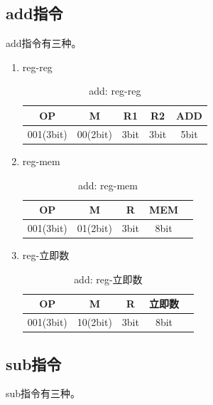 \documentclass[UTF8]{ctexrep}
\begin{document}
\subsection{add指令}
add指令有三种。

\begin{enumerate}
\item reg-reg
\begin{table}[H]
\centering
\begin{tabular}{|c|c|c|c|c|}
\hline
OP        & M        & R1   & R2   & ADD  \\ \hline
001(3bit) & 00(2bit) & 3bit & 3bit & 5bit \\ \hline
\end{tabular}
\caption{add: reg-reg}
\label{tab:7}
\end{table}

\item reg-mem
\begin{table}[H]
\centering
\begin{tabular}{|c|c|c|c|c|}
\hline
OP        & M        & R    & MEM  \\ \hline
001(3bit) & 01(2bit) & 3bit & 8bit \\ \hline
\end{tabular}
\caption{add: reg-mem}
\label{tab:8}
\end{table}

\item reg-立即数
\begin{table}[H]
\centering
\begin{tabular}{|c|c|c|c|c|}
\hline
OP        & M        & R    & 立即数  \\ \hline
001(3bit) & 10(2bit) & 3bit & 8bit \\ \hline
\end{tabular}
\caption{add: reg-立即数}
\label{tab:9}
\end{table}

\end{enumerate}

\subsection{sub指令}
sub指令有三种。
\end{document}
